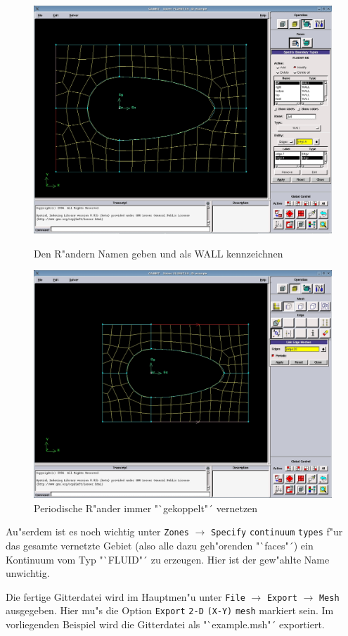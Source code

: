 \documentclass{article}
\begin{document}
\begin{figure}[hbp]
\centering
\includegraphics[scale = 0.26]{example01.jpg}
\caption{Den R"andern Namen geben und als WALL kennzeichnen}
\includegraphics[scale = 0.26]{example03.jpg}
\caption{Periodische R"ander immer "`gekoppelt"´ vernetzen}
\end{figure}

Au"serdem ist es noch wichtig unter \verb|Zones| \(\to\) \verb|Specify| \verb|continuum| \verb|types| f"ur das gesamte vernetzte Gebiet (also alle dazu geh"orenden "`faces"´) ein Kontinuum vom Typ "`FLUID"´ zu erzeugen. Hier ist der gew"ahlte Name unwichtig.

Die fertige Gitterdatei wird im Hauptmen"u unter \verb|File| \(\to\) \verb|Export| \(\to\) \verb|Mesh| ausgegeben. Hier mu"s die Option \verb|Export| \verb|2-D| \verb|(X-Y)| \verb|mesh| markiert sein. Im vorliegenden Beispiel wird die Gitterdatei als "`example.msh"´ exportiert.
\end{document}
